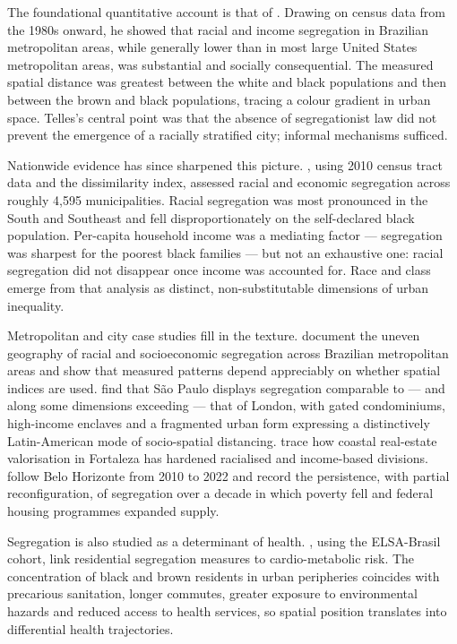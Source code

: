 \documentclass[pdflatex,sn-basic]{sn-jnl}%
\begin{document}
The foundational quantitative account is that of \citet{telles2004race}. Drawing on census data from the 1980s onward, he showed that racial and income segregation in Brazilian metropolitan areas, while generally lower than in most large United States metropolitan areas, was substantial and socially consequential. The measured spatial distance was greatest between the white and black populations and then between the brown and black populations, tracing a colour gradient in urban space. Telles's central point was that the absence of segregationist law did not prevent the emergence of a racially stratified city; informal mechanisms sufficed.

Nationwide evidence has since sharpened this picture. \citet{deSouza2023nationwide_english}, using 2010 census tract data and the dissimilarity index, assessed racial and economic segregation across roughly 4{,}595 municipalities. Racial segregation was most pronounced in the South and Southeast and fell disproportionately on the self-declared black population. Per-capita household income was a mediating factor --- segregation was sharpest for the poorest black families --- but not an exhaustive one: racial segregation did not disappear once income was accounted for. Race and class emerge from that analysis as distinct, non-substitutable dimensions of urban inequality.

Metropolitan and city case studies fill in the texture. \citet{barros2018unevengeographies} document the uneven geography of racial and socioeconomic segregation across Brazilian metropolitan areas and show that measured patterns depend appreciably on whether spatial indices are used. \citet{barros2024saopaulolondres} find that S\~ao Paulo displays segregation comparable to --- and along some dimensions exceeding --- that of London, with gated condominiums, high-income enclaves and a fragmented urban form expressing a distinctively Latin-American mode of socio-spatial distancing. \citet{danilofranca2022fortaleza} trace how coastal real-estate valorisation in Fortaleza has hardened racialised and income-based divisions. \citet{strauch2026bh20102022} follow Belo Horizonte from 2010 to 2022 and record the persistence, with partial reconfiguration, of segregation over a decade in which poverty fell and federal housing programmes expanded supply.

Segregation is also studied as a determinant of health. \citet{barber2018cardioelsa}, using the ELSA-Brasil cohort, link residential segregation measures to cardio-metabolic risk. The concentration of black and brown residents in urban peripheries coincides with precarious sanitation, longer commutes, greater exposure to environmental hazards and reduced access to health services, so spatial position translates into differential health trajectories.
\end{document}
